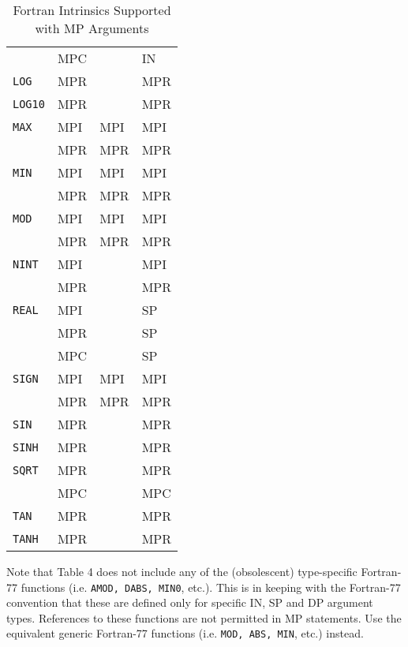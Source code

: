 \begin{table}
\begin{center}
\begin{small}
\begin{tabular}{|l|l|l|l|}
            &    MPC   &      &    IN \\
{\tt LOG}   &    MPR   &      &    MPR \\
{\tt LOG10} &    MPR   &      &    MPR \\
{\tt MAX}   &    MPI   &  MPI &    MPI \\
            &    MPR   &  MPR &    MPR \\
{\tt MIN}   &    MPI   &  MPI &    MPI \\
            &    MPR   &  MPR &    MPR \\
{\tt MOD}   &    MPI   &  MPI &    MPI \\
            &    MPR   &  MPR &    MPR \\
{\tt NINT}  &    MPI   &      &    MPI \\
            &    MPR   &      &    MPR \\
{\tt REAL}  &    MPI   &      &    SP \\
            &    MPR   &      &    SP \\
            &    MPC   &      &    SP \\
{\tt SIGN}  &    MPI   &  MPI &    MPI \\
            &    MPR   &  MPR &    MPR \\
{\tt SIN}   &    MPR   &      &    MPR \\
{\tt SINH}  &    MPR   &      &    MPR \\
{\tt SQRT}  &    MPR   &      &    MPR \\
            &    MPC   &      &    MPC \\
{\tt TAN}   &    MPR   &      &    MPR \\
{\tt TANH}  &    MPR   &      &    MPR \\
\hline
\end{tabular} \end{small} 
\caption{Fortran Intrinsics Supported with MP Arguments}
\end{center} \end{table}
 
Note that Table 4 does not include any of the (obsolescent)
type-specific Fortran-77 functions (i.e. {\tt AMOD, DABS, MIN0},
etc.).  This is in keeping with the Fortran-77 convention that these
are defined only for specific IN, SP and DP argument types.
References to these functions are not permitted in MP statements.  Use
the equivalent generic Fortran-77 functions (i.e. {\tt MOD, ABS, MIN},
etc.) instead.

